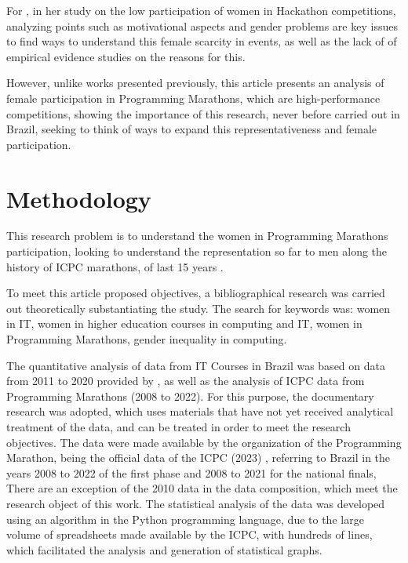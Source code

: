 \documentclass[12pt]{article}
\begin{document}
For \cite{Paganini:20}, in her study on the low participation of women in Hackathon competitions, analyzing points such as motivational aspects and gender problems are key issues to find ways to understand this female scarcity in events, as well as the lack of of empirical evidence studies on the reasons for this.

However, unlike works presented previously, this article presents an analysis of female participation in Programming Marathons, which are high-performance competitions, showing the importance of this research, never before carried out in Brazil, seeking to think of ways to expand this representativeness and female participation.


\section{Methodology}

This research problem is to understand the  women in Programming Marathons participation, looking to understand the representation so far to men along the history of ICPC marathons, of last 15 years .

To meet this article proposed objectives, a bibliographical research was carried out theoretically substantiating the \cite{LAKATOS:2021} study. The search for keywords was: women in IT, women in higher education courses in computing and IT, women in Programming Marathons, gender inequality in computing.

The quantitative analysis of data from IT Courses in Brazil was based on data from 2011 to 2020 provided by \cite{SBC2:23}, as well as the analysis of ICPC data from Programming Marathons (2008 to 2022). For this purpose, the documentary research \cite{Gil:2019} was adopted, which uses materials that have not yet received analytical treatment of the data, and can be treated in order to meet the research objectives. 
The data were made available by the organization of the Programming Marathon, being the official data of the ICPC (2023) \cite{ICPC:2023}, referring to Brazil in the years 2008 to 2022 of the first phase and 2008 to 2021 for the national finals, There are an exception of the 2010 data in the data composition, which meet the research object of this work. The statistical analysis of the data was developed using an algorithm in the Python programming language, due to the large volume of spreadsheets made available by the ICPC, with hundreds of lines, which facilitated the analysis and generation of statistical graphs.
\end{document}
